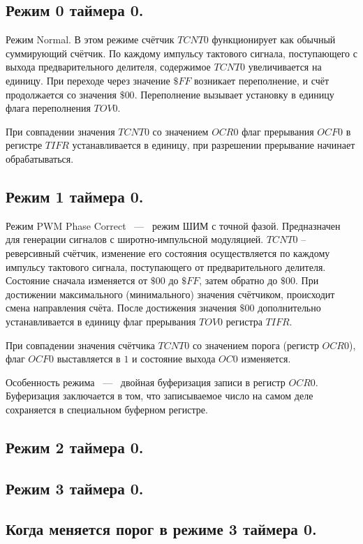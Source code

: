 \subsection{Режим 0 таймера 0.}
Режим Normal. В этом режиме счётчик $TCNT0$ функционирует как обычный 
суммирующий счётчик. По каждому импульсу тактового сигнала, 
поступающего с выхода предварительного делителя, содержимое
$TCNT0$ увеличивается на единицу. 
При переходе через значение $\$FF$ возникает переполнение, и счёт продолжается
со значения $\$00$. Переполнение вызывает установку в единицу флага переполнения
$TOV0$.

При совпадении значения $TCNT0$ со значением
$OCR0$ флаг прерывания $OCF0$ в регистре $TIFR$ устанавливается в единицу, 
при разрешении прерывание начинает обрабатываться.


\subsection{Режим 1 таймера 0.}
Режим PWM Phase Correct ~---~ режим ШИМ с точной фазой.
Предназначен для генерации сигналов с широтно-импульсной модуляцией. 
$TCNT0$ -- реверсивный счётчик, изменение его состояния 
осуществляется по каждому импульсу тактового сигнала,
поступающего от предварительного делителя. 
Состояние сначала изменяется от $\$00$ до $\$FF$, затем
обратно до $\$00$. При достижении максимального (минимального) 
значения счётчиком, происходит смена направления счёта. 
После достижения значения $\$00$ дополнительно устанавливается 
в единицу флаг прерывания $TOV0$ регистра $TIFR$.

При совпадении значения счётчика $TCNT0$ со значением порога (регистр $OCR0$), 
флаг $OCF0$ выставляется в $1$ и состояние выхода $OC0$ изменяется.

Особенность режима ~---~ двойная буферизация записи в регистр $OCR0$. 
Буферизация заключается в том, что записываемое число на самом деле сохраняется в
специальном буферном регистре.


\subsection{Режим 2 таймера 0.}


\subsection{Режим 3 таймера 0.}


\subsection{Когда меняется порог в режиме 3 таймера 0.}


